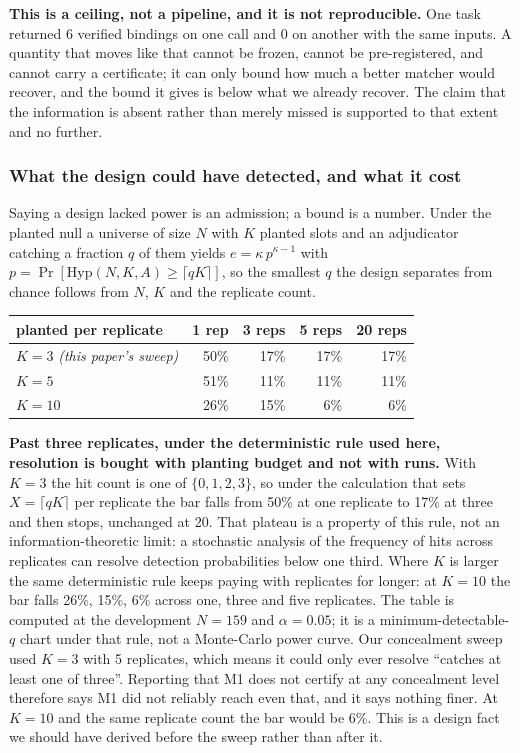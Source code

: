 \documentclass[10pt]{article}
\newcommand{\RM}[1]{{#1}}
\begin{document}
\textbf{This is a ceiling, not a pipeline, and it is not reproducible.} One task
returned \RM{6} verified bindings on one call and \RM{0} on another with the
same inputs. A quantity that moves like that cannot be frozen, cannot be
pre-registered, and cannot carry a certificate; it can only bound how much a
better matcher would recover, and the bound it gives is below what we already
recover. The claim that the information is absent rather than merely missed is
supported to that extent and no further.

\subsubsection{What the design could have detected, and what it cost}
\label{sec:power}
Saying a design lacked power is an admission; a bound is a number. Under the
planted null a universe of size $N$ with $K$ planted slots and an adjudicator
catching a fraction $q$ of them yields $e = \kappa\,p^{\kappa-1}$ with
$p = \Pr[\mathrm{Hyp}(N,K,A)\ge \lceil qK \rceil]$, so the smallest $q$ the
design separates from chance follows from $N$, $K$ and the replicate count.

\begin{center}
\small
\begin{tabular}{@{}lrrrr@{}}
\toprule
planted per replicate & \RM{1} rep & \RM{3} reps & \RM{5} reps & \RM{20} reps \\
\midrule
$K=\RM{3}$ \emph{(this paper's sweep)} & \RM{50\%} & \RM{17\%} & \RM{17\%} & \RM{17\%} \\
$K=\RM{5}$   & \RM{51\%} & \RM{11\%} & \RM{11\%} & \RM{11\%} \\
$K=\RM{10}$  & \RM{26\%} & \RM{15\%} & \RM{6\%}  & \RM{6\%}  \\
\bottomrule
\end{tabular}
\end{center}

\noindent \textbf{Past three replicates, under the deterministic rule used here,
resolution is bought with planting budget and not with runs.} With $K=\RM{3}$ the
hit count is one of $\{0,1,2,3\}$, so under the calculation that sets
$X=\lceil qK\rceil$ per replicate the bar falls from \RM{50\%} at one replicate
to \RM{17\%} at three and then stops, unchanged at \RM{20}. That plateau is a
property of this rule, not an information-theoretic limit: a stochastic analysis
of the frequency of hits across replicates can resolve detection probabilities
below one third. Where $K$ is larger the same deterministic rule keeps paying
with replicates for longer: at $K=\RM{10}$ the bar falls \RM{26\%}, \RM{15\%},
\RM{6\%} across one, three and five replicates. The table is computed at the
development $N=\RM{159}$ and $\alpha=\RM{0.05}$; it is a minimum-detectable-$q$
chart under that rule, not a Monte-Carlo power curve. Our concealment sweep used $K=\RM{3}$ with \RM{5} replicates, which means
it could only ever resolve ``catches at least one of three''. Reporting that M1
does not certify at any concealment level therefore says M1 did not reliably
reach even that, and it says nothing finer. At $K=\RM{10}$ and the same
replicate count the bar would be \RM{6\%}. This is a design fact we should have
derived before the sweep rather than after it.
\end{document}
